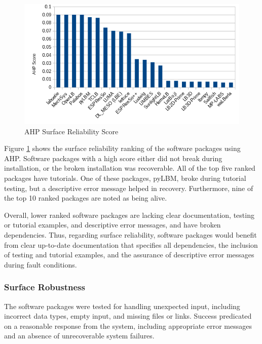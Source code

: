 \documentclass[12pt, notitlepage]{article}
\begin{document}
\begin{figure}[h!]
	\begin{center}
		\includegraphics[width=1.0\textwidth]{reliability_chart}
		\caption{AHP Surface Reliability Score}
		\label{Fig_Reliability}
	\end{center}
\end{figure}

Figure \ref{Fig_Reliability} shows the surface reliability ranking of the software packages using AHP. Software packages with a high score either did not break during installation, or the broken installation was recoverable. All of the top five ranked packages have tutorials. One of these packages, pyLBM, broke during tutorial testing, but a descriptive error message helped in recovery. Furthermore, nine of the top 10 ranked packages are noted as being alive. 

Overall, lower ranked software packages are lacking clear documentation, testing or tutorial examples, and descriptive error messages, and have broken dependencies. Thus, regarding surface reliability, software packages would benefit from clear up-to-date documentation that specifies all dependencies, the inclusion of testing and tutorial examples, and the assurance of descriptive error messages during fault conditions.

\subsubsection{Surface Robustness}

The software packages were tested for handling unexpected input, including incorrect data types, empty input, and missing files or links. Success predicated on a reasonable response from the system, including appropriate error messages and an absence of unrecoverable system failures. 
\end{document}
